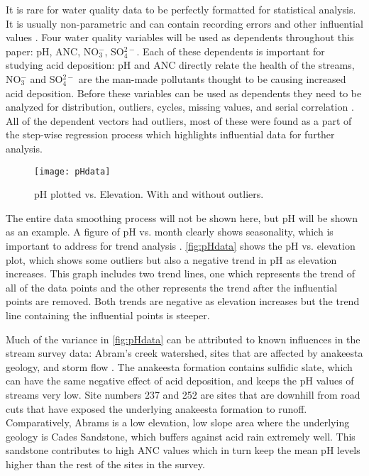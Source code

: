 It is rare for water quality data to be perfectly formatted for statistical analysis.
It is usually  non-parametric and can contain recording errors and other influential values \citep{helsel1992statistical}.
Four water quality variables will be used as dependents throughout this paper: pH, ANC, NO$_3^-$, SO$_4^{2-}$.
Each of these dependents is important for studying acid deposition: pH and ANC directly relate the health of the streams, NO$_3^-$ and SO$_4^{2-}$ are the man-made pollutants thought to be causing increased acid deposition.
Before these variables can be used as dependents they need to be analyzed for distribution, outliers, cycles, missing values, and serial correlation \citep{helsel1992statistical}.
All of the dependent vectors had outliers, most of these were found as a part of the step-wise regression process which highlights influential data for further analysis.

\begin{figure}[h!]
\centering
    \texttt{[image: pHdata]}\\
    \caption{pH plotted vs. Elevation. With and without outliers.}
    \label{fig:pHdata}
\end{figure}

The entire data smoothing process will not be shown here, but pH will be shown as an example.
A figure of pH vs. month clearly shows seasonality, which is important to address for trend analysis \citep{helsel1992statistical}.
\autoref{fig:pHdata} shows the pH vs. elevation plot, which shows some outliers but also a negative trend in pH as elevation increases.
This graph includes two trend lines, one which represents the trend of all of the data points and the other represents the trend after the influential points are removed. 
Both trends are negative as elevation increases but the trend line containing the influential points is steeper. 

Much of the variance in \autoref{fig:pHdata} can be attributed to known influences in the stream survey data: Abram's creek watershed, sites that are affected by anakeesta geology, and storm flow \citep{neff2012influence}.  
The anakeesta formation contains sulfidic slate, which can have the same negative effect of acid deposition,  and keeps the pH values of streams very low.
Site numbers 237 and 252 are sites that are downhill from road cuts that have exposed the underlying anakeesta formation to runoff.  
Comparatively, Abrams is a low elevation, low slope area where the underlying geology is Cades Sandstone, which buffers against acid rain extremely well. 
This sandstone contributes to high ANC values which in turn keep the mean pH levels higher than the rest of the sites in the survey. 

